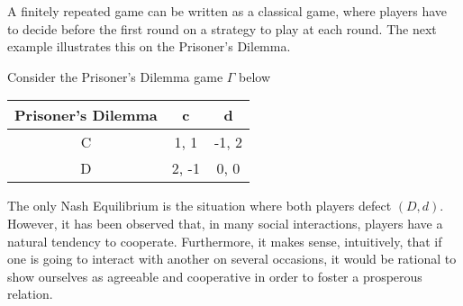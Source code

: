 A finitely repeated game can be written as a classical game, where players
have to decide before the first round on a strategy to play at each round.
The next example illustrates this on the Prisoner's Dilemma.
\begin{example}
    \label{ch9:ex:PD1}
    Consider the Prisoner's Dilemma game $\Gamma$ below
    \begin{center}
    \begin{tabular}{c|cc}
        Prisoner's Dilemma & c & d \\
        \hline
        C & 1, 1 & -1, 2 \\
        D & 2, -1 & 0, 0
    \end{tabular}
\end{center}
The only Nash Equilibrium is the situation where both players defect
$(D,d)$. However, it has been observed that, in many social interactions,
players have a natural tendency to cooperate.
Furthermore, it makes sense, intuitively, that if one is going to interact
with another on several occasions, it would be rational to show ourselves
as agreeable and cooperative in order to foster a prosperous relation.


\end{example}
